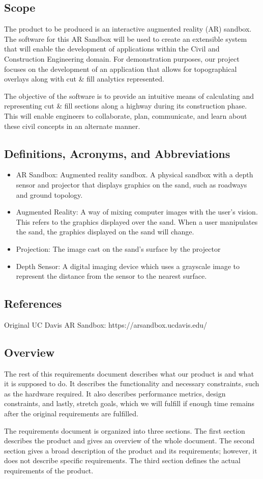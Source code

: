 \documentclass[onecolumn, draftclsnofoot,10pt, compsoc]{IEEEtran}
\begin{document}
\subsection{Scope}
The product to be produced is an interactive augmented reality (AR) sandbox. The software for this AR Sandbox will be used to create an extensible system that will enable the development of applications within the Civil and Construction Engineering domain.  For demonstration purposes, our project focuses on the development of an application that allows for topographical overlays along with cut \& fill analytics represented.
\par The objective of the software is to provide an intuitive means of calculating and representing cut \& fill sections along a highway during its construction phase.  This will enable engineers to collaborate, plan, communicate, and learn about these civil concepts in an alternate manner.
\subsection{Definitions, Acronyms, and Abbreviations}
\begin{itemize}
\item AR Sandbox: Augmented reality sandbox. A physical sandbox with a depth sensor and projector that displays graphics on the sand, such as roadways and ground topology.
\item Augmented Reality: A way of mixing computer images with the user's vision. This refers to the graphics displayed over the sand. When a user manipulates the sand, the graphics displayed on the sand will change.
\item Projection: The image cast on the sand's surface by the projector
\item Depth Sensor: A digital imaging device which uses a grayscale image to represent the distance from the sensor to the nearest surface.
\end{itemize}
\subsection{References}
Original UC Davis AR Sandbox: https://arsandbox.ucdavis.edu/
\subsection{Overview}
The rest of this requirements document describes what our product is and what it is supposed to do. It describes the functionality and necessary constraints, such as the hardware required. It also describes performance metrics, design constraints, and lastly, stretch goals, which we will fulfill if enough time remains after the original requirements are fulfilled.
\par The requirements document is organized into three sections. The first section describes the product and gives an overview of the whole document. The second section gives a broad description of the product and its requirements; however, it does not describe specific requirements. The third section defines the actual requirements of the product.
\end{document}
